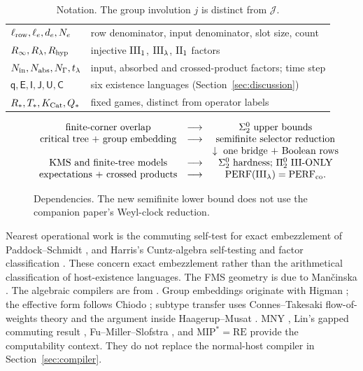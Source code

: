 \begin{table}[ht]
\begin{tabular}{@{}ll@{}}
$\ell_{\rm row},\ell_e,d_e,N_e$ & row denominator, input denominator, slot size, count\\
$R_\infty,R_\lambda,R_{\rm hyp}$ & injective $\mathrm{III}_1$, $\mathrm{III}_\lambda$, $\mathrm{II}_1$ factors\\
$N_{\rm in},N_{\rm abs},N_\Gamma,t_\lambda$ & input, absorbed and crossed-product factors; time step\\
$\mathsf q,\mathsf E,\mathsf I,\mathsf J,\mathsf U,\mathsf C$ & six existence languages (Section~\ref{sec:discussion})\\
$R_*,T_*,K_{\operatorname{Cat}},Q_*$ & fixed games, distinct from operator labels\\
\bottomrule
\end{tabular}
\caption{Notation. The group involution $j$ is distinct from $\mathcal J$.}
\end{table}

\begin{figure}[ht]
\centering\small
\[
\begin{array}{ccc}
\text{finite-corner overlap}&\longrightarrow&\Sigma^0_2\text{ upper bounds}\\
\text{critical tree + group embedding}&\longrightarrow&
\text{semifinite selector reduction}\\
&&\downarrow\ \text{one bridge + Boolean rows}\\
\text{KMS and finite-tree models}&\longrightarrow&
\Sigma^0_2\text{ hardness; }\Pi^0_2\text{ III-ONLY}\\
\text{expectations + crossed products}&\longrightarrow&
\mathrm{PERF}(\mathrm{III}_\lambda)=\mathrm{PERF}_{\mathrm{co}}.
\end{array}
\]
\caption{Dependencies. The new semifinite lower bound does not use the
companion paper's Weyl-clock reduction.}
\end{figure}

Nearest operational work is the commuting self-test for exact embezzlement
of Paddock--Schmidt \cite{PS}, and Harris's Cuntz-algebra self-testing and
factor classification \cite{Harris}. These concern exact embezzlement
rather than the arithmetical classification of host-existence languages.
The FMS geometry is due to Man\v cinska \cite{Mancinska}.
The algebraic compilers are from \cite[Lemma 4.2 and Theorem B]{Entropy}.
Group embeddings originate with Higman \cite{Higman}; the effective form follows Chiodo \cite[Theorem 2.2]{Chiodo};
subtype transfer uses Connes--Takesaki flow-of-weights theory \cite{ConnesTakesaki} and the argument inside
Haagerup--Musat \cite[Lemma 3.8]{HM}.
MNY \cite{MNY}, Lin's gapped commuting result \cite{Lin}, Fu--Miller--Slofstra
\cite{FMS}, and $\mathrm{MIP}^*=\mathrm{RE}$ \cite{MIPRE}
provide the computability context. They do not replace the normal-host
compiler in Section~\ref{sec:compiler}.

